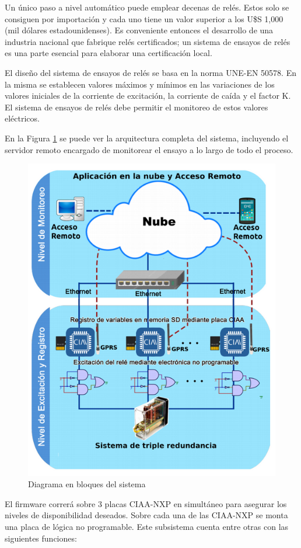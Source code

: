 \documentclass[11pt]{charter}
\begin{document}
Un único paso a nivel automático puede emplear decenas de relés. Estos solo se consiguen por importación y cada uno tiene un valor superior a los U\$S 1,000 (mil dólares estadounidenses). Es conveniente entonces el desarrollo de una industria nacional que fabrique relés certificados; un sistema de ensayos de relés es una parte esencial para elaborar una certificación local.

El diseño del sistema de ensayos de relés se basa en la norma UNE-EN 50578. En la misma se establecen valores máximos y mínimos en las variaciones de los valores iniciales de la corriente de excitación, la corriente de caída y el factor K. El sistema de ensayos de relés debe permitir el monitoreo de estos valores eléctricos.

En la Figura \ref{fig:diagBloques2} se puede ver la arquitectura completa del sistema, incluyendo el servidor remoto encargado de monitorear el ensayo a lo largo de todo el proceso.

\vspace{25px}

\begin{figure}[H]
\centering 
\includegraphics[width=.6\textwidth]{./Figuras/bloques.png}
\caption{Diagrama en bloques del sistema}
\label{fig:diagBloques2}
\end{figure}

\vspace{25px}

El firmware correrá sobre 3 placas CIAA-NXP en simultáneo para asegurar los niveles de disponibilidad deseados. Sobre cada una de las CIAA-NXP se monta una placa de lógica no programable. Este subsistema cuenta entre otras con las siguientes funciones:
\end{document}
